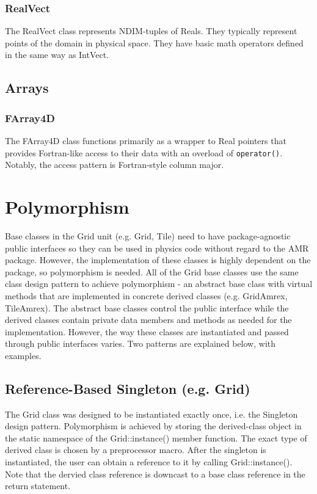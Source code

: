 \documentclass[letterpaper,12pt]{article}
\begin{document}
\subsubsection{RealVect}

The RealVect class represents NDIM-tuples of Reals. They typically represent points of the domain in physical space. They have basic math operators defined in the same way as IntVect.

\subsection{Arrays}
\subsubsection*{FArray4D}

The FArray4D class functions primarily as a wrapper to Real pointers that provides Fortran-like access to their data with an overload of \texttt{operator()}. Notably, the access pattern is Fortran-style column major.



\section{Polymorphism}

Base classes in the Grid unit (e.g. Grid, Tile) need to have package-agnostic public interfaces so they can be used in physics code without regard to the AMR package. However, the implementation of these classes is highly dependent on the package, so polymorphism is needed. All of the Grid base classes use the same class design pattern to achieve polymorphism - an abstract base class with virtual methods that are implemented in concrete derived classes (e.g. GridAmrex, TileAmrex). The abstract base classes control the public interface while the derived classes contain private data members and methods as needed for the implementation. However, the way these classes are instantiated and passed through public interfaces varies. Two patterns are explained below, with examples.


\subsection{Reference-Based Singleton (e.g. Grid)}
The Grid class was designed to be instantiated exactly once, i.e. the Singleton design pattern. Polymorphism is achieved by storing the derived-class object in the static namespace of the Grid::instance() member function. The exact type of derived class is chosen by a preprocessor macro. After the singleton is instantiated, the user can obtain a reference to it by calling Grid::instance(). Note that the dervied class reference is downcast to a base class reference in the return statement.
\end{document}
